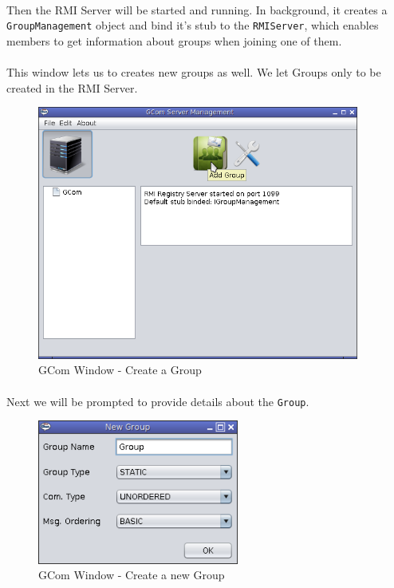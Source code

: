 \documentclass[a4paper,english,twoside]{article}
\begin{document}
\paragraph{}
Then the RMI Server will be started and running. In background, it creates a \texttt{GroupManagement} object and bind it's stub to the \texttt{RMIServer}, which enables members to get information about groups when joining one of them.

\paragraph{}
This window lets us to creates new groups as well. We let Groups only to be created in the RMI Server.

\begin{figure}[h]
\begin{center}
\includegraphics[width=400px]{GCom-NewGroup.png}
\caption{GCom Window - Create a Group}
\end{center}
\end{figure}
\newpage
\paragraph{}
Next we will be prompted to provide details about the \texttt{Group}.

\begin{figure}[h]
\begin{center}
\includegraphics[width=250px]{GCome-Group.png}
\caption{GCom Window - Create a new Group}
\end{center}
\end{figure}
\end{document}
